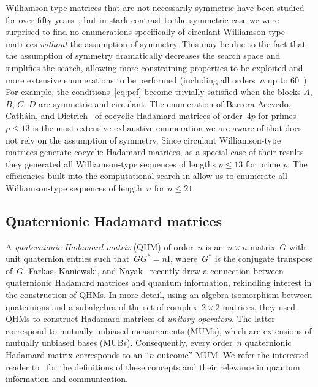 \documentclass[12pt]{article}
\numberwithin{equation}{section}
\newcommand{\id}{{\mathrm I}}
\begin{document}
Williamson-type matrices that are not necessarily symmetric have been studied
for over fifty years~\cite{Wallis1973,Wallis1974}, but in stark contrast to the symmetric case
we were surprised to find no
enumerations specifically of circulant Williamson-type matrices \emph{without} the assumption of symmetry.
This may be due to the fact that the assumption of symmetry dramatically decreases the search space
and simplifies the search, allowing more constraining properties to be exploited and more extensive
enumerations to be performed (including all orders~$n$ up to 60~\cite{BKG20-williamson-conjecture,Holzmann2008}).
For example, the conditions~\eqref{eq:pcf} become trivially satisfied
when the blocks $A$, $B$, $C$, $D$ are symmetric and circulant.
The enumeration
of Barrera Acevedo, Catháin, and Dietrich~\cite{BarreraAcevedo2019} of cocyclic Hadamard matrices
of order~$4p$ for primes $p\leq13$ is the most extensive exhaustive enumeration
we are aware of that does not rely on the assumption of symmetry.
Since circulant Williamson-type matrices generate
cocyclic Hadamard matrices, as a special case of their results they generated
all Williamson-type sequences of lengths $p\leq 13$ for prime $p$. The efficiencies built into the computational search in  allow us to enumerate all Williamson-type sequences of length~$n$ for $n\leq21$.

\subsection{Quaternionic Hadamard matrices}
\label{sec-qhm-context}

A \emph{quaternionic Hadamard matrix} (QHM) of order~$n$ is an~$n \times n$ matrix~$G$ with unit quaternion entries such that~$GG^* = n\id$, where~$G^*$ is the conjugate transpose of~$G$.
Farkas, Kaniewski, and Nayak~\cite{FKN23-mum-superdense-coding} recently drew a connection between quaternionic Hadamard matrices and quantum information, rekindling interest in the construction of QHMs. In more detail, using an algebra isomorphism between quaternions and a subalgebra of the set of complex~$2 \times 2$ matrices, they used QHMs to construct Hadamard matrices of \emph{unitary operators\/}. The latter correspond to mutually unbiased measurements (MUMs), which are extensions of mutually unbiased bases (MUBs).
Consequently, every order~$n$ quaternionic Hadamard matrix corresponds to an ``$n$-outcome'' MUM\@.
We refer the interested reader to~\cite{FKN23-mum-superdense-coding} for the definitions of these concepts and their relevance in quantum information and communication.
\end{document}

